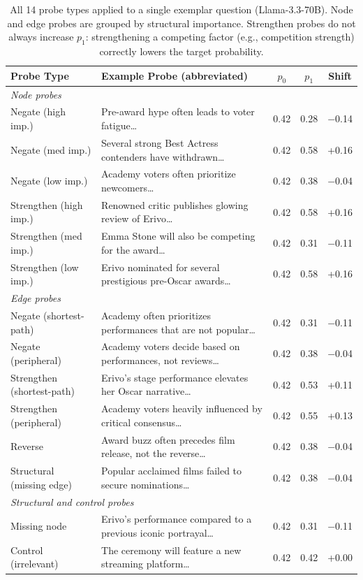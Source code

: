 \documentclass[11pt]{article}
\begin{document}
\begin{table}[t]
\centering
\small
\begin{tabular}{llccc}
\toprule
\textbf{Probe Type} & \textbf{Example Probe (abbreviated)} & \textbf{$p_0$} & \textbf{$p_1$} & \textbf{Shift} \\
\midrule
\multicolumn{5}{l}{\textit{Node probes}} \\
Negate (high imp.) & Pre-award hype often leads to voter fatigue\ldots & 0.42 & 0.28 & $-$0.14 \\
Negate (med imp.) & Several strong Best Actress contenders have withdrawn\ldots & 0.42 & 0.58 & +0.16 \\
Negate (low imp.) & Academy voters often prioritize newcomers\ldots & 0.42 & 0.38 & $-$0.04 \\
Strengthen (high imp.) & Renowned critic publishes glowing review of Erivo\ldots & 0.42 & 0.58 & +0.16 \\
Strengthen (med imp.) & Emma Stone will also be competing for the award\ldots & 0.42 & 0.31 & $-$0.11 \\
Strengthen (low imp.) & Erivo nominated for several prestigious pre-Oscar awards\ldots & 0.42 & 0.58 & +0.16 \\
\midrule
\multicolumn{5}{l}{\textit{Edge probes}} \\
Negate (shortest-path) & Academy often prioritizes performances that are not popular\ldots & 0.42 & 0.31 & $-$0.11 \\
Negate (peripheral) & Academy voters decide based on performances, not reviews\ldots & 0.42 & 0.38 & $-$0.04 \\
Strengthen (shortest-path) & Erivo's stage performance elevates her Oscar narrative\ldots & 0.42 & 0.53 & +0.11 \\
Strengthen (peripheral) & Academy voters heavily influenced by critical consensus\ldots & 0.42 & 0.55 & +0.13 \\
Reverse & Award buzz often precedes film release, not the reverse\ldots & 0.42 & 0.38 & $-$0.04 \\
Structural (missing edge) & Popular acclaimed films failed to secure nominations\ldots & 0.42 & 0.38 & $-$0.04 \\
\midrule
\multicolumn{5}{l}{\textit{Structural and control probes}} \\
Missing node & Erivo's performance compared to a previous iconic portrayal\ldots & 0.42 & 0.31 & $-$0.11 \\
Control (irrelevant) & The ceremony will feature a new streaming platform\ldots & 0.42 & 0.42 & +0.00 \\
\bottomrule
\end{tabular}
\caption{All 14 probe types applied to a single exemplar question (Llama-3.3-70B). Node and edge probes are grouped by structural importance. Strengthen probes do not always increase $p_1$: strengthening a competing factor (e.g., competition strength) correctly lowers the target probability.}
\label{tab:probe_examples}
\end{table}
\end{document}
